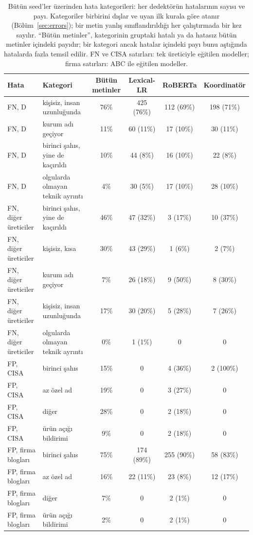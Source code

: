 \begin{table}[t]
\centering
\footnotesize
\caption{Bütün seed'ler üzerinden hata kategorileri: her dedektörün hatalarının sayısı ve payı. Kategoriler birbirini dışlar ve uyan ilk kurala göre atanır (Bölüm~\ref{sec:errors}); bir metin yanlış sınıflandırıldığı her çalıştırmada bir kez sayılır. ``Bütün metinler'', kategorinin gruptaki hatalı ya da hatasız bütün metinler içindeki payıdır; bir kategori ancak hatalar içindeki payı bunu aştığında hatalarda fazla temsil edilir. FN ve CISA satırları: tek üreticiyle eğitilen modeller; firma satırları: ABC ile eğitilen modeller.}
\label{tab:errors}
\begin{tabular}{llcccc}
\toprule
Hata & Kategori & Bütün metinler & Lexical-LR & RoBERTa & Koordinatör \\
\midrule
FN, D & kişisiz, insan uzunluğunda & 76\% & 425 (76\%) & 112 (69\%) & 198 (71\%) \\
FN, D & kurum adı geçiyor & 11\% & 60 (11\%) & 17 (10\%) & 30 (11\%) \\
FN, D & birinci şahıs, yine de kaçırıldı & 10\% & 44 (8\%) & 16 (10\%) & 22 (8\%) \\
FN, D & olgularda olmayan teknik ayrıntı & 4\% & 30 (5\%) & 17 (10\%) & 28 (10\%) \\
FN, diğer üreticiler & birinci şahıs, yine de kaçırıldı & 46\% & 47 (32\%) & 3 (17\%) & 10 (37\%) \\
FN, diğer üreticiler & kişisiz, kısa & 30\% & 43 (29\%) & 1 (6\%) & 2 (7\%) \\
FN, diğer üreticiler & kurum adı geçiyor & 7\% & 26 (18\%) & 9 (50\%) & 8 (30\%) \\
FN, diğer üreticiler & kişisiz, insan uzunluğunda & 17\% & 30 (20\%) & 5 (28\%) & 7 (26\%) \\
FN, diğer üreticiler & olgularda olmayan teknik ayrıntı & 0\% & 1 (1\%) & 0 & 0 \\
FP, CISA & birinci şahıs & 15\% & 0 & 4 (36\%) & 2 (100\%) \\
FP, CISA & az özel ad & 19\% & 0 & 3 (27\%) & 0 \\
FP, CISA & diğer & 28\% & 0 & 2 (18\%) & 0 \\
FP, CISA & ürün açığı bildirimi & 9\% & 0 & 2 (18\%) & 0 \\
FP, firma blogları & birinci şahıs & 75\% & 174 (89\%) & 255 (90\%) & 58 (83\%) \\
FP, firma blogları & az özel ad & 16\% & 22 (11\%) & 23 (8\%) & 12 (17\%) \\
FP, firma blogları & diğer & 7\% & 0 & 2 (1\%) & 0 \\
FP, firma blogları & ürün açığı bildirimi & 2\% & 0 & 2 (1\%) & 0 \\
\bottomrule
\end{tabular}
\end{table}
